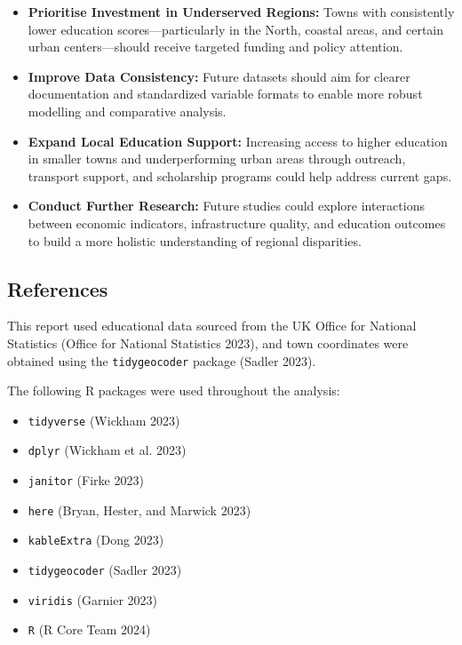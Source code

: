 \documentclass[
  letterpaper,
  DIV=11,
  numbers=noendperiod]{scrartcl}
\providecommand{\tightlist}{%
  \setlength{\itemsep}{0pt}\setlength{\parskip}{0pt}}\usepackage{longtable,booktabs,array}
\begin{document}
\begin{itemize}
\tightlist
\item
  \textbf{Prioritise Investment in Underserved Regions:} Towns with
  consistently lower education scores---particularly in the North,
  coastal areas, and certain urban centers---should receive targeted
  funding and policy attention.
\item
  \textbf{Improve Data Consistency:} Future datasets should aim for
  clearer documentation and standardized variable formats to enable more
  robust modelling and comparative analysis.
\item
  \textbf{Expand Local Education Support:} Increasing access to higher
  education in smaller towns and underperforming urban areas through
  outreach, transport support, and scholarship programs could help
  address current gaps.
\item
  \textbf{Conduct Further Research:} Future studies could explore
  interactions between economic indicators, infrastructure quality, and
  education outcomes to build a more holistic understanding of regional
  disparities.
\end{itemize}

\subsection{References}\label{references}

This report used educational data sourced from the UK Office for
National Statistics (Office for National Statistics 2023), and town
coordinates were obtained using the \texttt{tidygeocoder} package
(Sadler 2023).

The following R packages were used throughout the analysis:

\begin{itemize}
\tightlist
\item
  \texttt{tidyverse} (Wickham 2023)
\item
  \texttt{dplyr} (Wickham et al. 2023)
\item
  \texttt{janitor} (Firke 2023)
\item
  \texttt{here} (Bryan, Hester, and Marwick 2023)
\item
  \texttt{kableExtra} (Dong 2023)
\item
  \texttt{tidygeocoder} (Sadler 2023)
\item
  \texttt{viridis} (Garnier 2023)
\item
  \texttt{R} (R Core Team 2024)
\end{itemize}
\end{document}
